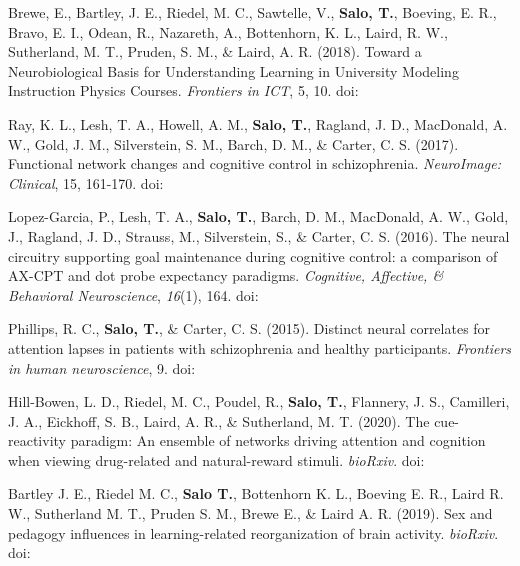 \documentclass[10pt]{article}
\newcommand{\sectionstyle}{\LARGE \fontfamily{lmr}\selectfont}
\newcommand{\textlink}[3][blue]{\href{#2}{\color{#1}{#3}}}
\begin{document}
\begin{hangparas}{.25in}{1}
	\bigskip

	Brewe, E., Bartley, J. E., Riedel, M. C., Sawtelle, V., \textbf{Salo, T.},
	Boeving, E. R., Bravo, E. I., Odean, R., Nazareth, A., Bottenhorn, K. L.,
	Laird, R. W., Sutherland, M. T., Pruden, S. M., \& Laird, A. R. (2018).
	Toward a Neurobiological Basis for Understanding Learning in University Modeling
	Instruction Physics Courses. \emph{Frontiers in ICT}, 5, 10.
	doi:\textlink{https://doi.org/10.3389/fict.2018.00010}{10.3389/fict.2018.00010}

	\bigskip

	Ray, K. L., Lesh, T. A., Howell, A. M., \textbf{Salo, T.}, Ragland, J. D.,
	MacDonald, A. W., Gold, J. M., Silverstein, S. M., Barch, D. M., \& Carter,
	C. S. (2017). Functional network changes and cognitive control in schizophrenia.
	\emph{NeuroImage: Clinical}, 15, 161-170.
	doi:\textlink{https://doi.org/10.1016/j.nicl.2017.05.001}{10.1016/j.nicl.2017.05.001}

	\bigskip

	Lopez-Garcia, P., Lesh, T. A., \textbf{Salo, T.}, Barch, D. M., MacDonald,
	A. W., Gold, J., Ragland, J. D., Strauss, M., Silverstein, S., \& Carter, C. S.
	(2016). The neural circuitry supporting goal maintenance during cognitive
	control: a comparison of AX-CPT and dot probe expectancy paradigms.
	\emph{Cognitive, Affective, \& Behavioral Neuroscience}, \emph{16}(1), 164.
	doi:\textlink{https://doi.org/10.3758/s13415-015-0384-1}{10.3758/s13415-015-0384-1}

	\bigskip

	Phillips, R. C., \textbf{Salo, T.}, \& Carter, C. S. (2015). Distinct neural
	correlates for attention lapses in patients with schizophrenia and healthy
	participants. \emph{Frontiers in human neuroscience}, 9.
	doi:\textlink{https://doi.org/10.3389/fnhum.2015.00502}{10.3389/fnhum.2015.00502}

\end{hangparas}

\bigskip

\begin{center}\sectionstyle{PREPRINTS}\end{center}

\begin{hangparas}{.25in}{1}

	Hill-Bowen, L. D., Riedel, M. C., Poudel, R., \textbf{Salo, T.}, Flannery, J. S.,
	Camilleri, J. A., Eickhoff, S. B., Laird, A. R., \& Sutherland, M. T. (2020).
	The cue-reactivity paradigm: An ensemble of networks driving attention and
	cognition when viewing drug-related and natural-reward stimuli.
	\emph{bioRxiv}.
	doi:\textlink{https://doi.org/10.1101/2020.02.26.966549}{10.1101/2020.02.26.966549}

	\bigskip

	Bartley J. E., Riedel M. C., \textbf{Salo T.}, Bottenhorn K. L.,
	Boeving E. R., Laird R. W., Sutherland M. T., Pruden S. M., Brewe E., \&
	Laird A. R. (2019).
	Sex and pedagogy influences in learning-related reorganization of brain activity.
	\emph{bioRxiv}. doi:\textlink{https://doi.org/10.1101/791301}{10.1101/791301}

\end{hangparas}
\end{document}
